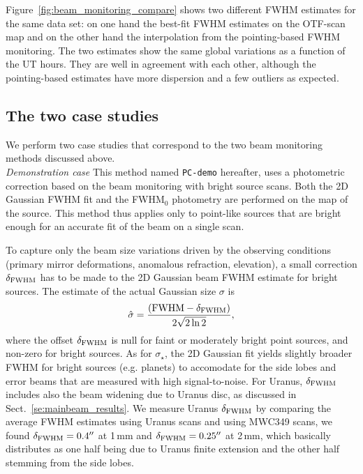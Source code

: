 %
Figure~\ref{fig:beam_monitoring_compare} shows two different FWHM %
estimates for the same data set: on one hand the best-fit FWHM %
estimates on the OTF-scan map and on the other hand the interpolation from
the pointing-based FWHM %
monitoring. The two estimates show the same global variations as a
function of the UT hours. They are well in agreement with each
other, although the pointing-based estimates have more dispersion and
a few outliers as expected.


\subsection{The two case studies}

We perform two case studies that correspond to the two beam monitoring
methods discussed above.\\

\noindent \emph{Demonstration case} This method named {\tt PC-demo} hereafter, uses a
photometric correction based on the beam monitoring with bright source
scans. Both the 2D Gaussian FWHM fit and the FWHM$_0$ photometry are performed
on the map of the source. This method thus applies only to point-like sources
that are bright enough for an accurate fit of the beam on a single scan.

To capture only the beam size variations driven by the
observing conditions (primary mirror deformations, anomalous
refraction, elevation), a small correction $\delta_{\rm{FWHM}}$ has to be made to
the 2D Gaussian beam FWHM estimate for bright sources. The estimate of the
actual Gaussian size $\sigma$ is
\begin{equation}
  \hat{\sigma} = \frac{(\rm{FWHM} - \delta_{\rm{FWHM}})}{2\sqrt{2 \ln{2}}}, 
\end{equation} 
where the offset $\delta_{\rm{FWHM}}$ is null for faint or moderately
bright point sources, and non-zero for bright sources.
As for $\sigma_\star$, the 2D Gaussian fit yields slightly broader
FWHM for bright sources (e.g. planets) to accomodate
for the side lobes and error beams that are measured with high signal-to-noise.
For Uranus, $\delta_{\rm{FWHM}}$ includes also the beam widening due
to Uranus disc, as discussed in Sect.~\ref{se:mainbeam_results}.
We measure Uranus $\delta_{\rm{FWHM}}$
by comparing the average %
FWHM estimates using Uranus
scans and using MWC349 scans, we found $\delta_{\rm{FWHM}} = 0.4''$ at
1\,mm and $\delta_{\rm{FWHM}} = 0.25''$ at 2\,mm, which basically
distributes as one half being due to Uranus finite extension and the
other half stemming from the side lobes.\\

